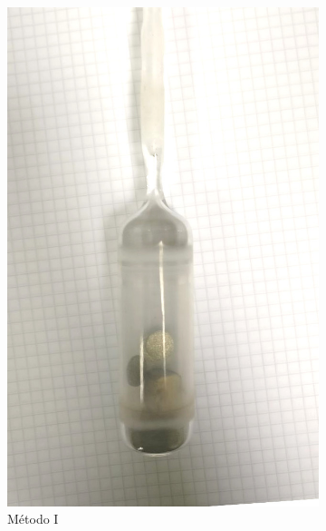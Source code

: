 \documentclass[a4paper,12pt,fleqn,twoside,openany]{book}
\begin{document}
 \begin{figure}[h]
    \centering
    \begin{subfigure}{0.2\textwidth}
        \includegraphics[width=\textwidth]{Img/Procedimiento/ampolla.jpg}
        \caption{Método I}
        \label{fig:ampolla}
    \end{subfigure}
    \begin{subfigure}{0.3\textwidth}

\end{subfigure}
\end{figure}
\end{document}
